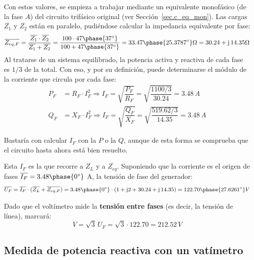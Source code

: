 \begin{example}
Con estos valores, se empieza a trabajar mediante un equivalente monofásico (de la fase $A$) del circuito trifásico original (ver Sección~\ref{sec.c_eq_mon}). Las cargas $\overline{Z_1}$ y $\overline{Z_2}$ están en paralelo, pudiéndose calcular la impedancia equivalente por fase:
\begin{equation*}
    \overline{Z_{eq,F}}=\dfrac{\overline{Z_1}\cdot\overline{Z_2}}{\overline{Z_1}+\overline{Z_2}}=\dfrac{100\cdot 47\phase{37^\circ}}{100+ 47\phase{37^\circ}}=33.47\phase{25.3787^\circ}\Omega=30.24+\mathrm{j}\,14.35\Omega
\end{equation*}
Al tratarse de un sistema equilibrado, la potencia activa y reactiva de cada fase es $1/3$ de la total. Con eso, y por su definición, puede determinarse el módulo de la corriente que circula por cada fase:
\begin{align*}
    P_F&=R_F\cdot I_F^2\Rightarrow I_F=\sqrt{\dfrac{P_F}{R_F}}=\sqrt{\dfrac{1100/3}{30.24}}=3.48\,A\\
    Q_F&=X_F\cdot I_F^2\Rightarrow I_F=\sqrt{\dfrac{Q_F}{X_F}}=\sqrt{\dfrac{519.62/3}{14.35}}=3.48\,A
\end{align*}
\begin{remark}
    Bastaría con calcular $I_F$ con la $P$ o la $Q$, aunque de esta forma se comprueba que el circuito hasta ahora está bien resuelto. 
\end{remark}
Esta $I_F$ es la que recorre a $\overline{Z_L}$ y a $\overline{Z_{eq}}$. Suponiendo que la corriente es el origen de fases $\overline{I_F}=3.48\phase{0^\circ}$ A, la tensión de fase del generador:
\begin{equation*}
    \overline{U_F}=\overline{I_F}\cdot (\overline{Z_L}+\overline{Z_{eq,F}})=3.48\phase{0^\circ}\cdot(1+\mathrm{j}2+30.24+\mathrm{j}\,14.35)=122.70\phase{27.6261^\circ} V
\end{equation*}

Dado que el voltímetro mide la \textbf{tensión entre fases} (es decir, la tensión de línea), marcará:
\begin{equation*}
    V=\sqrt{3}\,U_F=\sqrt{3}\cdot 122.70=212.52\,V
\end{equation*}
\end{example}


\subsection{Medida de potencia reactiva con un vatímetro}

